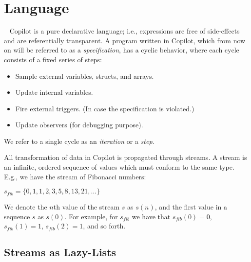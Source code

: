 
\section{Language}~\label{sec:language} Copilot is a pure declarative language;
i.e., expressions are free of side-effects and are referentially transparent.
%
A program written in Copilot, which from now on will be referred to as a
\emph{specification}, has a cyclic behavior, where each cycle consists of a
fixed series of steps:

\begin{itemize}
\item Sample external variables, structs, and arrays.
\item Update internal variables.
\item Fire external triggers. (In case the specification is violated.)
\item Update observers (for debugging purpose).
\end{itemize}

\noindent We refer to a single cycle as an \emph{iteration} or a \emph{step}.

All transformation of data in Copilot is propagated through streams.
%
A stream is an infinite, ordered sequence of values which must conform to the same type.
%
E.g., we have the stream of Fibonacci numbers:

\begin{center}
$s_{fib} = \{0, 1, 1, 2, 3, 5, 8, 13, 21, \dots \}$
\end{center}

\noindent We denote the $n$th value of the stream $s$ as $s(n)$, and the first
value in a sequence $s$ as $s(0)$.
%
For example, for $s_{fib}$ we have that $s_{fib}(0) = 0$,
$s_{fib}(1) = 1$, $s_{fib}(2) = 1$, and so forth.

\subsection{Streams as Lazy-Lists} \label{sec:stream}

